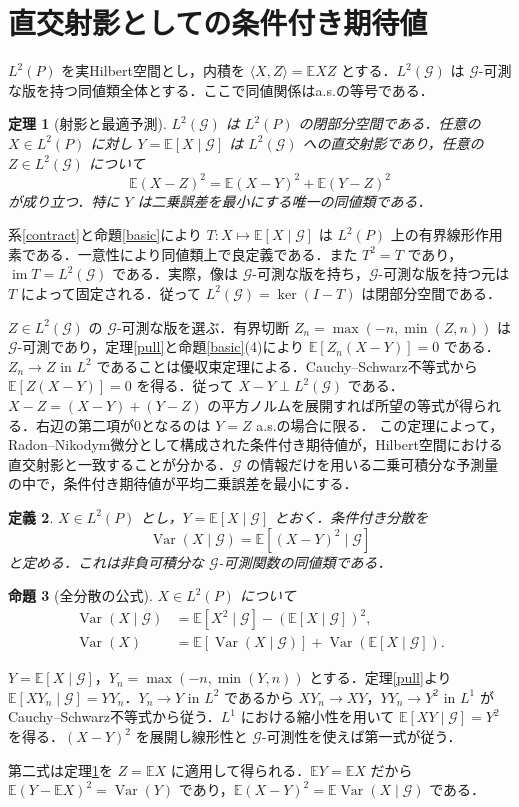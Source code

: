 \documentclass[a5paper,10pt,onecolumn]{jsarticle}
\makeatletter
\theoremstyle{mathnotetheorem}
\newtheorem{theorem}{定理}[section]
\newtheorem{definition}[theorem]{定義}
\newtheorem{proposition}[theorem]{命題}
\renewcommand{\proofname}{証明}
\renewenvironment{proof}[1][\proofname]{%
  \par\pushQED{\qed}\normalfont\topsep4\p@\@plus2\p@\relax
  \trivlist\item[\hskip\labelsep\bfseries #1]\ignorespaces
}{\popQED\endtrivlist\@endpefalse}
\newcommand{\G}{\mathcal G}
\newcommand{\E}{\mathbb E}
\newcommand{\1}{\mathbf{1}}
\DeclareMathOperator{\Var}{Var}
\makeatother
\begin{document}
\section{直交射影としての条件付き期待値}
$L^2(P)$ を実Hilbert空間とし，内積を $\langle X,Z\rangle=\E XZ$ とする．$L^2(\G)$ は $\G$-可測な版を持つ同値類全体とする．ここで同値関係はa.s.の等号である．
\begin{theorem}[射影と最適予測]\label{projection}
$L^2(\G)$ は $L^2(P)$ の閉部分空間である．任意の $X\in L^2(P)$ に対し $Y=\E[X\mid\G]$ は $L^2(\G)$ への直交射影であり，任意の $Z\in L^2(\G)$ について
\[
 \E(X-Z)^2=\E(X-Y)^2+\E(Y-Z)^2
\]
が成り立つ．特に $Y$ は二乗誤差を最小にする唯一の同値類である．
\end{theorem}
\begin{proof}
系\ref{contract}と命題\ref{basic}により $T:X\mapsto\E[X\mid\G]$ は $L^2(P)$ 上の有界線形作用素である．一意性により同値類上で良定義である．また $T^2=T$ であり，$\operatorname{im}T=L^2(\G)$ である．実際，像は $\G$-可測な版を持ち，$\G$-可測な版を持つ元は $T$ によって固定される．従って $L^2(\G)=\ker(I-T)$ は閉部分空間である．

$Z\in L^2(\G)$ の $\G$-可測な版を選ぶ．有界切断 $Z_n=\max(-n,\min(Z,n))$ は $\G$-可測であり，定理\ref{pull}と命題\ref{basic}(4)により $\E[Z_n(X-Y)]=0$ である．$Z_n\to Z$ in $L^2$ であることは優収束定理による．Cauchy--Schwarz不等式から $\E[Z(X-Y)]=0$ を得る．従って $X-Y\perp L^2(\G)$ である．$X-Z=(X-Y)+(Y-Z)$ の平方ノルムを展開すれば所望の等式が得られる．右辺の第二項が0となるのは $Y=Z$ a.s.の場合に限る．
\end{proof}
この定理によって，Radon--Nikodym微分として構成された条件付き期待値が，Hilbert空間における直交射影と一致することが分かる．$\G$ の情報だけを用いる二乗可積分な予測量の中で，条件付き期待値が平均二乗誤差を最小にする．
\begin{definition}
$X\in L^2(P)$ とし，$Y=\E[X\mid\G]$ とおく．条件付き分散を
\[
 \Var(X\mid\G)=\E[(X-Y)^2\mid\G]
\]
と定める．これは非負可積分な $\G$-可測関数の同値類である．
\end{definition}
\begin{proposition}[全分散の公式]\label{totalvar}
$X\in L^2(P)$ について
\begin{align*}
 \Var(X\mid\G)&=\E[X^2\mid\G]-(\E[X\mid\G])^2,\\
 \Var(X)&=\E[\Var(X\mid\G)]
              +\Var(\E[X\mid\G]).
\end{align*}
\end{proposition}
\begin{proof}
$Y=\E[X\mid\G]$，$Y_n=\max(-n,\min(Y,n))$ とする．定理\ref{pull}より $\E[XY_n\mid\G]=YY_n$．$Y_n\to Y$ in $L^2$ であるから $XY_n\to XY$，$YY_n\to Y^2$ in $L^1$ がCauchy--Schwarz不等式から従う．$L^1$ における縮小性を用いて $\E[XY\mid\G]=Y^2$ を得る．$(X-Y)^2$ を展開し線形性と $\G$-可測性を使えば第一式が従う．

第二式は定理\ref{projection}を $Z=\E X$ に適用して得られる．$\E Y=\E X$ だから $\E(Y-\E X)^2=\Var(Y)$ であり，$\E(X-Y)^2=\E\Var(X\mid\G)$ である．
\end{proof}
\end{document}
